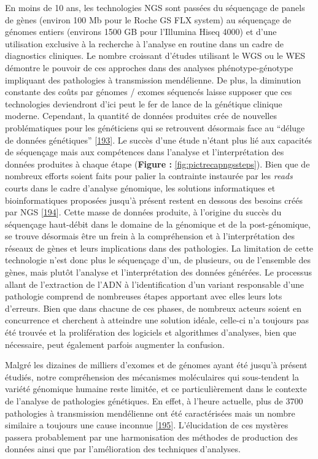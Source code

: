 \documentclass[12pt,a4paper,twoside]{ugathesis}
\theoremstyle{definition}
\theoremstyle{definition}
\theoremstyle{definition}
\theoremstyle{remark}
\begin{document}
En moins de 10 ans, les technologies NGS sont passées du séquençage de
panels de gènes (environ 100 Mb pour le Roche GS FLX system) au
séquençage de génomes entiers (environs 1500 GB pour l'Illumina Hiseq
4000) et d'une utilisation exclusive à la recherche à l'analyse en
routine dans un cadre de diagnostics cliniques. Le nombre croissant
d'études utilisant le WGS ou le WES démontre le pouvoir de ces approches
dans des analyses phénotype-génotype impliquant des pathologies à
transmission mendélienne. De plus, la diminution constante des coûts par
génomes / exomes séquencés laisse supposer que ces technologies
deviendront d'ici peut le fer de lance de la génétique clinique moderne.
Cependant, la quantité de données produites crée de nouvelles
problématiques pour les généticiens qui se retrouvent désormais face au
``déluge de données génétiques''
{[}\protect\hyperlink{ref-Schatz2013}{193}{]}. Le succès d'une étude
n'étant plus lié aux capacités de séquençage mais aux compétences dans
l'analyse et l'interprétation des données produites à chaque étape
(\textbf{Figure :} \ref{fig:pictrecapngssteps}). Bien que de nombreux
efforts soient faits pour palier la contrainte instaurée par les
\emph{reads} courts dans le cadre d'analyse génomique, les solutions
informatiques et bioinformatiques proposées jusqu'à présent restent en
dessous des besoins créés par NGS
{[}\protect\hyperlink{ref-McPherson2009}{194}{]}. Cette masse de données
produite, à l'origine du succès du séquençage haut-débit dans le domaine
de la génomique et de la post-génomique, se trouve désormais être un
frein à la compréhension et à l'interprétation des réseaux de gènes et
leurs implications dans des pathologies. La limitation de cette
technologie n'est donc plus le séquençage d'un, de plusieurs, ou de
l'ensemble des gènes, mais plutôt l'analyse et l'interprétation des
données générées. Le processus allant de l'extraction de l'ADN à
l'identification d'un variant responsable d'une pathologie comprend de
nombreuses étapes apportant avec elles leurs lots d'erreurs. Bien que
dans chacune de ces phases, de nombreux acteurs soient en concurrence et
cherchent à atteindre une solution idéale, celle-ci n'a toujours pas été
trouvée et la prolifération des logiciels et algorithmes d'analyses,
bien que nécessaire, peut également parfois augmenter la confusion.

Malgré les dizaines de milliers d'exomes et de génomes ayant été jusqu'à
présent étudiés, notre compréhension des mécanismes moléculaires qui
sous-tendent la variété génomique humaine reste limitée, et ce
particulièrement dans le contexte de l'analyse de pathologies
génétiques. En effet, à l'heure actuelle, plus de 3700 pathologies à
transmission mendélienne ont été caractérisées mais un nombre similaire
a toujours une cause inconnue
{[}\protect\hyperlink{ref-Amberger2011}{195}{]}. L'élucidation de ces
mystères passera probablement par une harmonisation des méthodes de
production des données ainsi que par l'amélioration des techniques
d'analyses.
\end{document}
